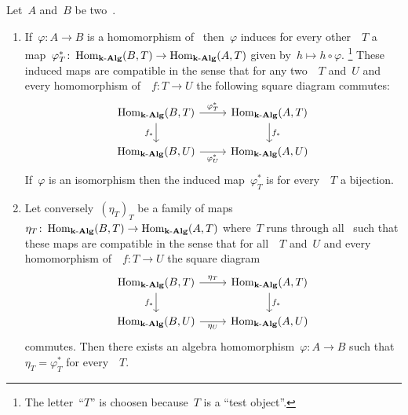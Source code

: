\begin{lemma}
  \label{yoneda lemma very weak version}
  Let~$A$ and~$B$ be two~{\algebras{$\kf$}}.
  \begin{enumerate}
    \item
      If~$\varphi \colon A \to B$ is a homomorphism of~{\algebras{$\kf$}} then~$\varphi$ induces for every other~{\algebra{$\kf$}}~$T$ a map~$\varphi^*_T \colon \operatorname{Hom}_{\mathbf{k}\text{-}\mathbf{Alg}}(B,T) \to \operatorname{Hom}_{\mathbf{k}\text{-}\mathbf{Alg}}(A,T)$ given by~$h \mapsto h \circ \varphi$.%
      \footnote{The letter~\enquote{$T$} is choosen because~$T$ is a \enquote{test object}.}
      These induced maps are compatible in the sense that for any two~{\algebras{$\kf$}}~$T$ and~$U$ and every homomorphism of~{\algebras{$\kf$}}~$f \colon T \to U$ the following square diagram commutes:
      \[
        \begin{tikzcd}
          \Hom_{\cAlg{\kf}}(B,T)
          \arrow{r}[above]{\varphi^*_T}
          \arrow{d}[left]{f_*}
          &
          \Hom_{\cAlg{\kf}}(A,T)
          \arrow{d}[right]{f_*}
          \\
          \Hom_{\cAlg{\kf}}(B,U)
          \arrow{r}[below]{\varphi^*_U}
          &
          \Hom_{\cAlg{\kf}}(A,U)
        \end{tikzcd}
      \]
      If~$\varphi$ is an isomorphism then the induced map~$\varphi^*_T$ is for every~{\algebra{$\kf$}}~$T$ a bijection.
    \item
      \label{natural homomorphisms}
      Let conversely~$(\eta_T)_T$ be a family of maps~$\eta_T \colon \operatorname{Hom}_{\mathbf{k}\text{-}\mathbf{Alg}}(B,T) \to \operatorname{Hom}_{\mathbf{k}\text{-}\mathbf{Alg}}(A,T)$ where~$T$ runs through all~{\algebra{$\kf$}} such that these maps are compatible in the sense that for all~{\algebras{$\kf$}}~$T$ and~$U$ and every homomorphism of~{\algebras{$\kf$}}~$f \colon T \to U$ the square diagram
      \begin{equation}
        \label{natural square}
        \begin{tikzcd}
          \Hom_{\cAlg{\kf}}(B,T)
          \arrow{r}[above]{\eta_T}
          \arrow{d}[left]{f_*}
          &
          \Hom_{\cAlg{\kf}}(A,T)
          \arrow{d}[right]{f_*}
          \\
          \Hom_{\cAlg{\kf}}(B,U)
          \arrow{r}[below]{\eta_U}
          &
          \Hom_{\cAlg{\kf}}(A,U)
        \end{tikzcd}
      \end{equation}
      commutes.
      Then there exists an algebra homomorphism~$\varphi \colon A \to B$ such that~$\eta_T = \varphi^*_T$ for every~{\algebra{$\kf$}}~$T$.

\end{enumerate}
\end{lemma}
